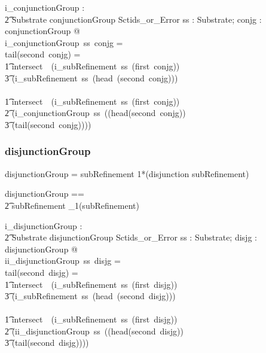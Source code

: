 \documentclass{article}
\def\bnf#1{{\scriptsize {{#1}} }}
\begin{document}
\begin{gendef}
    i\_conjunctionGroup : \\
\t2 Substrate \fun conjunctionGroup \fun Sctids\_or\_Error
\where
   \forall ss : Substrate;  conjg : conjunctionGroup @ \\
i\_conjunctionGroup~ss~conjg = \\
   \IF tail(second~conjg) = \langle \rangle \THEN \\
\t1 intersect~~(i\_subRefinement~ss~(first~conjg)) \\
\t3 (i\_subRefinement~ss~(head~(second~conjg))) \\
   \ELSE \\
\t1 intersect~~(i\_subRefinement~ss~(first~conjg)) \\
\t2 (i\_conjunctionGroup~ss~((head(second~conjg)) \\
\t3 (tail(second~conjg))))
\end{gendef}

\subsubsection{disjunctionGroup}
\begin{framed}
\noindent
\bnf{disjunctionGroup = subRefinement 1*(disjunction subRefinement)}
\end{framed}

\begin{zed}
disjunctionGroup == \\
\t2 subRefinement \cross \seq_1(subRefinement)
\end{zed}

\begin{gendef}
    i\_disjunctionGroup : \\
\t2 Substrate \fun disjunctionGroup \fun Sctids\_or\_Error
\where
   \forall ss : Substrate;  disjg : disjunctionGroup @ \\
ii\_disjunctionGroup~ss~disjg = \\
   \IF tail(second~disjg) = \langle \rangle \THEN \\
\t1 intersect~~(i\_subRefinement~ss~(first~disjg)) \\
\t3 (i\_subRefinement~ss~(head~(second~disjg))) \\
   \ELSE \\
\t1 intersect~~(i\_subRefinement~ss~(first~disjg)) \\
\t2 (ii\_disjunctionGroup~ss~((head(second~disjg)) \\
\t3 (tail(second~disjg))))
\end{gendef}
\end{document}
